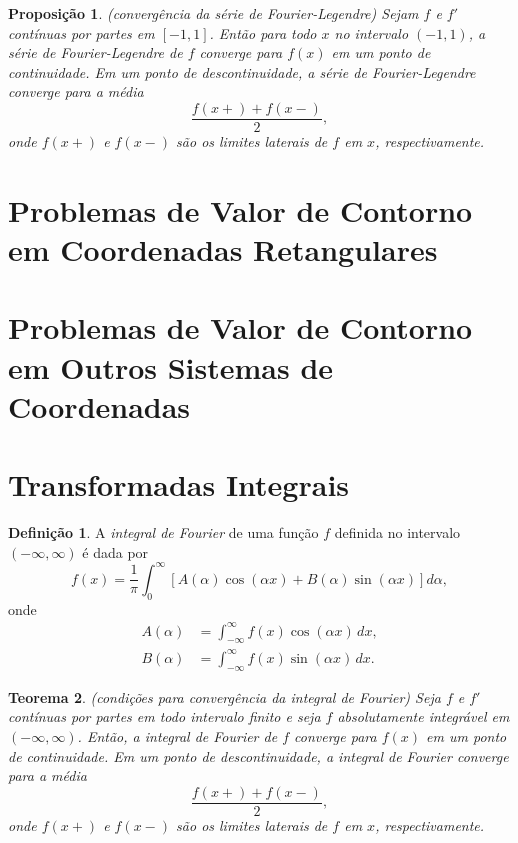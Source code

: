 \documentclass[12pt]{article}
\theoremstyle{plain}
\newtheorem{thm}{Teorema}[section]
\newtheorem{prop}[thm]{Proposição}
\theoremstyle{definition}
\newtheorem{defn}{Definição}[section]
\theoremstyle{remark}
\begin{document}
\begin{prop} (convergência da série de Fourier-Legendre)
    Sejam \(f\) e \(f'\) contínuas por partes em \([-1,1]\). Então para todo \(x\) no intervalo \((-1,1)\), a série de Fourier-Legendre de \(f\) converge para \(f(x)\) em um ponto de continuidade. Em um ponto de descontinuidade, a série de Fourier-Legendre converge para a média
    \begin{equation*}
        \frac{f(x+) + f(x-)}{2},
    \end{equation*}
    \noindent onde \(f(x+)\) e \(f(x-)\) são os limites laterais de \(f\) em \(x\), respectivamente.
\end{prop}

\section{Problemas de Valor de Contorno em Coordenadas Retangulares}
\section{Problemas de Valor de Contorno em Outros Sistemas de Coordenadas}
\section{Transformadas Integrais}

\begin{defn}
    A \emph{integral de Fourier} de uma função \(f\) definida no intervalo \(\left(-\infty, \infty\right)\) é dada por
    \begin{equation}
        f(x) = \frac{1}{\pi} \int_{0}^{\infty} \left[A(\alpha) \cos(\alpha x) + B(\alpha) \sin(\alpha x)\right] d\alpha,
    \end{equation}
    \noindent onde
    \begin{align}
        A(\alpha) &= \int_{-\infty}^{\infty} f(x) \cos(\alpha x) \, dx, \\
        B(\alpha) &= \int_{-\infty}^{\infty} f(x) \sin(\alpha x) \, dx.
    \end{align}
\end{defn}

\begin{thm} (condições para convergência da integral de Fourier)
    Seja \(f\) e \(f'\) contínuas por partes em todo intervalo finito e seja \(f\) absolutamente integrável em \((-\infty, \infty)\). Então, a integral de Fourier de \(f\) converge para \(f(x)\) em um ponto de continuidade. Em um ponto de descontinuidade, a integral de Fourier converge para a média
    \begin{equation}
        \frac{f(x+) + f(x-)}{2},
    \end{equation}
    \noindent onde \(f(x+)\) e \(f(x-)\) são os limites laterais de \(f\) em \(x\), respectivamente.
\end{thm}
\end{document}
